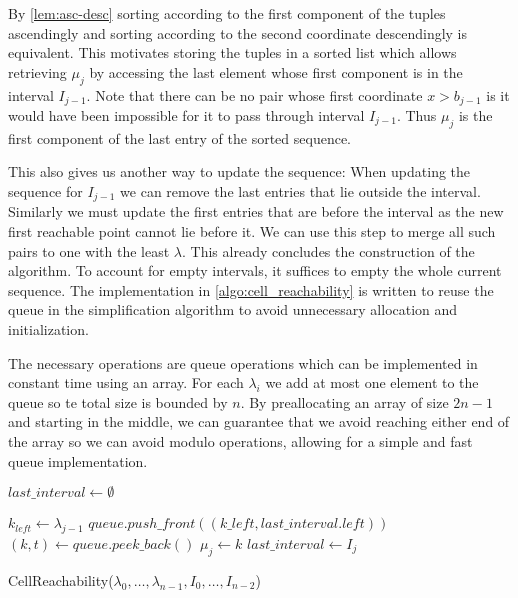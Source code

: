 By \cref{lem:asc-desc} sorting according to the first component of the tuples ascendingly and sorting according to the second coordinate descendingly is equivalent. This motivates storing the tuples in a sorted list which allows retrieving \(\mu_j\) by accessing the last element whose first component is in the interval \(I_{j-1}\). Note that there can be no pair whose first coordinate \(x > b_{j-1}\) is it would have been impossible for it to pass through interval \(I_{j-1}\). Thus \(\mu_j\) is the first component of the last entry of the sorted sequence. 

This also gives us another way to update the sequence: When updating the sequence for \(I_{j-1}\) we can remove the last entries that lie outside the interval. Similarly we must update the first entries that are before the interval as the new first reachable point cannot lie before it. We can use this step to merge all such pairs to one with the least \(\lambda\). This already concludes the construction of the algorithm. To account for empty intervals, it suffices to empty the whole current sequence. The implementation in \cref{algo:cell_reachability} is written to reuse the queue in the simplification algorithm to avoid unnecessary allocation and initialization.

The necessary operations are queue operations which can be implemented in constant time using an array. For each \(\lambda_i\) we add at most one element to the queue so te total size is bounded by \(n\). By preallocating an array of size \(2n - 1\) and starting in the middle, we can guarantee that we avoid reaching either end of the array so we can avoid modulo operations, allowing for a simple and fast queue implementation.


\begin{algorithm}[htb]
  \DontPrintSemicolon
  \BlankLine
	\(last\_interval \gets \emptyset\) \;
	 {

		\(k_{left} \gets \lambda_{j-1}\)\;
		\(queue.push\_front((k\_left, last\_interval.left))\) \;
		\((k, t) \gets queue.peek\_back()\) \;
		\(\mu_j \gets k\) \;
		\(last\_interval \gets I_j\)
	}
	\caption{CellReachability(\(\lambda_0, \dots, \lambda_{n-1}, I_0, \dots, I_{n-2}\))}
  \label{algo:cell_reachability}
\end{algorithm}

